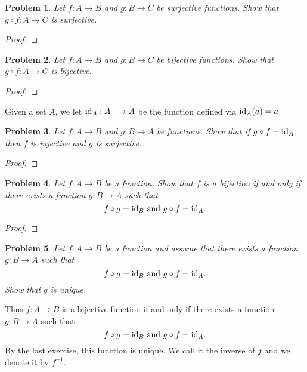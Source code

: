 \documentclass[reqno]{amsart}
\theoremstyle{plain}
\newtheorem{problem}{Problem}
\theoremstyle{definition}
\begin{document}
\begin{problem}
Let $f:A \longrightarrow B$ and $g:B \longrightarrow C$ be surjective functions.  Show that $g \circ f: A \longrightarrow C$ is surjective.
\end{problem}
\begin{proof}

\end{proof}

\begin{problem}
Let $f:A \longrightarrow B$ and $g:B \longrightarrow C$ be bijective functions.  Show that $g \circ f: A \longrightarrow C$ is bijective.
\end{problem}
\begin{proof}

\end{proof}

Given a set $A$, we let ${\rm id}_{A}: A \longrightarrow A$ be the function defined via ${\rm id}_{A}(a) = a$.

\begin{problem}
Let $f:A \longrightarrow B$ and $g:B \longrightarrow A$ be functions.  Show that if $g \circ f = {\rm id}_{A}$, then $f$ is injective and $g$ is surjective.
\end{problem}
\begin{proof}

\end{proof}

\begin{problem}
Let $f:A \longrightarrow B$ be a function.  Show that $f$ is a bijection if and only if there exists a function $g:B \longrightarrow A$ such that
$$f \circ g = {\rm id}_{B} \text{ and } g \circ f = {\rm id}_{A}.$$
\end{problem}
\begin{proof}

\end{proof}

\begin{problem}
Let $f:A \longrightarrow B$ be a function and assume that there exists a function $g:B \longrightarrow A$ such that
$$f \circ g = {\rm id}_{B} \text{ and } g \circ f = {\rm id}_{A}.$$
Show that $g$ is unique.
\end{problem}

Thus $f:A \longrightarrow B$ is a bijective function if and only if there exists a function $g:B \longrightarrow A$ such that
$$f \circ g = {\rm id}_{B} \text{ and } g \circ f = {\rm id}_{A}.$$
By the last exercise, this function is unique.  We call it the inverse of $f$ and we denote it by $f^{-1}$.
\end{document}
